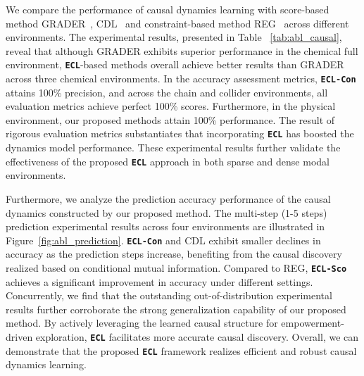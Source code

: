 We compare the performance of causal dynamics learning with score-based method GRADER~\citep{ding2022generalizing}, CDL~\citep{wang2022causal} and constraint-based method REG~\citep{wang2021task} across different environments. The experimental results, presented in Table ~\ref{tab:abl_causal}, reveal that although GRADER exhibits superior performance in the chemical full environment, \texttt{\textbf{ECL}}-based methods overall achieve better results than GRADER across three chemical environments. 
In the accuracy assessment metrics, \texttt{\textbf{ECL-Con}} attains 100\% precision, and across the chain and collider environments, all evaluation metrics achieve perfect 100\% scores. 
Furthermore, in the physical environment, our proposed methods attain 100\% performance. The result of rigorous evaluation metrics substantiates that incorporating \texttt{\textbf{ECL}} has boosted the dynamics model performance. 
These experimental results further validate the effectiveness of the proposed \texttt{\textbf{ECL}} approach in both sparse and dense modal environments. 

Furthermore, we analyze the prediction accuracy performance of the causal dynamics constructed by our proposed method. The multi-step (1-5 steps) prediction experimental results across four environments are illustrated in Figure~\ref{fig:abl_prediction}. \texttt{\textbf{ECL-Con}} and CDL exhibit smaller declines in accuracy as the prediction steps increase, benefiting from the causal discovery realized based on conditional mutual information. Compared to REG, \texttt{\textbf{ECL-Sco}} achieves a significant improvement in accuracy under different settings. Concurrently, we find that the outstanding out-of-distribution experimental results further corroborate the strong generalization capability of our proposed method. 
By actively leveraging the learned causal structure for empowerment-driven exploration, \texttt{\textbf{ECL}} facilitates more accurate causal discovery. 
Overall, we can demonstrate that the proposed \texttt{\textbf{ECL}} framework realizes efficient and robust causal dynamics learning.


